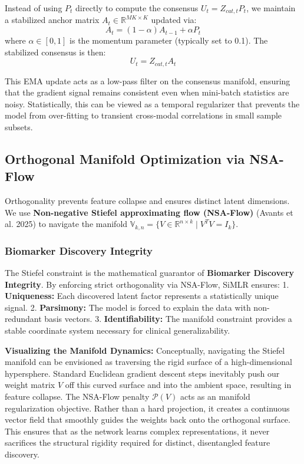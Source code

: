 \documentclass[
  letterpaper,
]{report}
\begin{document}
Instead of using \(P_t\) directly to compute the consensus
\(U_t = Z_{cat, t} P_t\), we maintain a stabilized anchor matrix
\(A_t \in \mathbb{R}^{MK \times K}\) updated via:
\[ A_t = (1 - \alpha) A_{t-1} + \alpha P_t \] where
\(\alpha \in [0, 1]\) is the momentum parameter (typically set to 0.1).
The stabilized consensus is then: \[ U_t = Z_{cat, t} A_t \]

This EMA update acts as a low-pass filter on the consensus manifold,
ensuring that the gradient signal remains consistent even when
mini-batch statistics are noisy. Statistically, this can be viewed as a
temporal regularizer that prevents the model from over-fitting to
transient cross-modal correlations in small sample subsets.

\subsection{Orthogonal Manifold Optimization via
NSA-Flow}\label{orthogonal-manifold-optimization-via-nsa-flow}

Orthogonality prevents feature collapse and ensures distinct latent
dimensions. We use \textbf{Non-negative Stiefel approximating flow
(NSA-Flow)} ({Avants et al.} 2025) to navigate the manifold
\(\mathbb{V}_{k,n} = \{ V \in \mathbb{R}^{n \times k} \mid V^T V = I_k \}\).

\subsubsection{Biomarker Discovery
Integrity}\label{biomarker-discovery-integrity}

The Stiefel constraint is the mathematical guarantor of
\textbf{Biomarker Discovery Integrity}. By enforcing strict
orthogonality via NSA-Flow, SiMLR ensures: 1. \textbf{Uniqueness:} Each
discovered latent factor represents a statistically unique signal. 2.
\textbf{Parsimony:} The model is forced to explain the data with
non-redundant basis vectors. 3. \textbf{Identifiability:} The manifold
constraint provides a stable coordinate system necessary for clinical
generalizability.

\textbf{Visualizing the Manifold Dynamics:} Conceptually, navigating the
Stiefel manifold can be envisioned as traversing the rigid surface of a
high-dimensional hypersphere. Standard Euclidean gradient descent steps
inevitably push our weight matrix \(V\) off this curved surface and into
the ambient space, resulting in feature collapse. The NSA-Flow penalty
\(\mathcal{P}(V)\) acts as an manifold regularization objective. Rather
than a hard projection, it creates a continuous vector field that
smoothly guides the weights back onto the orthogonal surface. This
ensures that as the network learns complex representations, it never
sacrifices the structural rigidity required for distinct, disentangled
feature discovery.
\end{document}
